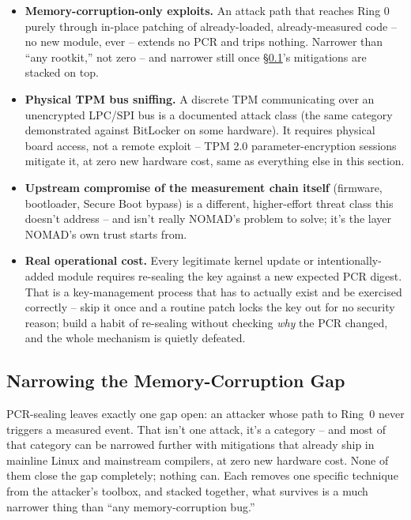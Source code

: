 \documentclass[11pt,a4paper]{article}
\begin{document}
\begin{notebox}
\begin{itemize}
  \item \textbf{Memory-corruption-only exploits.} An attack path that
    reaches Ring 0 purely through in-place patching of already-loaded,
    already-measured code -- no new module, ever -- extends no PCR and
    trips nothing. Narrower than ``any rootkit,'' not zero -- and
    narrower still once \S\ref{sec:memcorr-narrowing}'s mitigations are
    stacked on top.
  \item \textbf{Physical TPM bus sniffing.} A discrete TPM
    communicating over an unencrypted LPC/SPI bus is a documented
    attack class (the same category demonstrated against BitLocker on
    some hardware). It requires physical board access, not a remote
    exploit -- TPM 2.0 parameter-encryption sessions mitigate it, at
    zero new hardware cost, same as everything else in this section.
  \item \textbf{Upstream compromise of the measurement chain itself}
    (firmware, bootloader, Secure Boot bypass) is a different, higher-effort
    threat class this doesn't address -- and isn't really NOMAD's problem
    to solve; it's the layer NOMAD's own trust starts from.
  \item \textbf{Real operational cost.} Every legitimate kernel update
    or intentionally-added module requires re-sealing the key against a
    new expected PCR digest. That is a key-management process that has
    to actually exist and be exercised correctly -- skip it once and a
    routine patch locks the key out for no security reason; build a
    habit of re-sealing without checking \emph{why} the PCR changed,
    and the whole mechanism is quietly defeated.
\end{itemize}
\end{notebox}

\subsection{Narrowing the Memory-Corruption Gap}
\label{sec:memcorr-narrowing}

PCR-sealing leaves exactly one gap open: an attacker whose path to
Ring~0 never triggers a measured event. That isn't one attack, it's a
category -- and most of that category can be narrowed further with
mitigations that already ship in mainline Linux and mainstream
compilers, at zero new hardware cost. None of them close the gap
completely; nothing can. Each removes one specific technique from the
attacker's toolbox, and stacked together, what survives is a much
narrower thing than ``any memory-corruption bug.''
\end{document}
